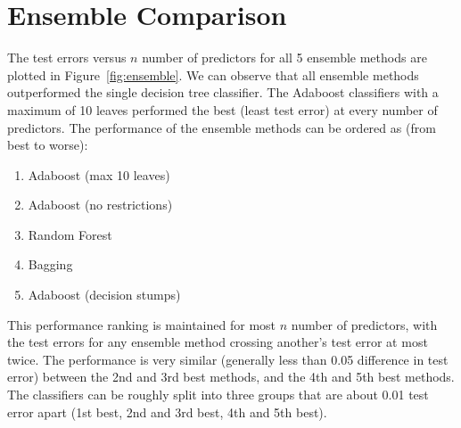 \documentclass[12pt]{article}
\begin{document}
\section*{Ensemble Comparison}
The test errors versus $n$ number of predictors for all 5 ensemble methods are plotted in Figure~\ref{fig:ensemble}. We can observe that all ensemble methods outperformed the single decision tree classifier. The Adaboost classifiers with a maximum of 10 leaves performed the best (least test error) at every number of predictors. The performance of the ensemble methods can be ordered as (from best to worse):
\begin{enumerate}
	\item Adaboost (max 10 leaves)
	\item Adaboost (no restrictions)
	\item Random Forest
	\item Bagging
	\item Adaboost (decision stumps)
\end{enumerate}

This performance ranking is maintained for most $n$ number of predictors, with the test errors for any ensemble method crossing another's test error at most twice. The performance is very similar (generally less than 0.05 difference in test error) between the 2nd and 3rd best methods, and the 4th and 5th best methods. The classifiers can be roughly split into three groups that are about 0.01 test error apart (1st best, 2nd and 3rd best, 4th and 5th best).
\end{document}

